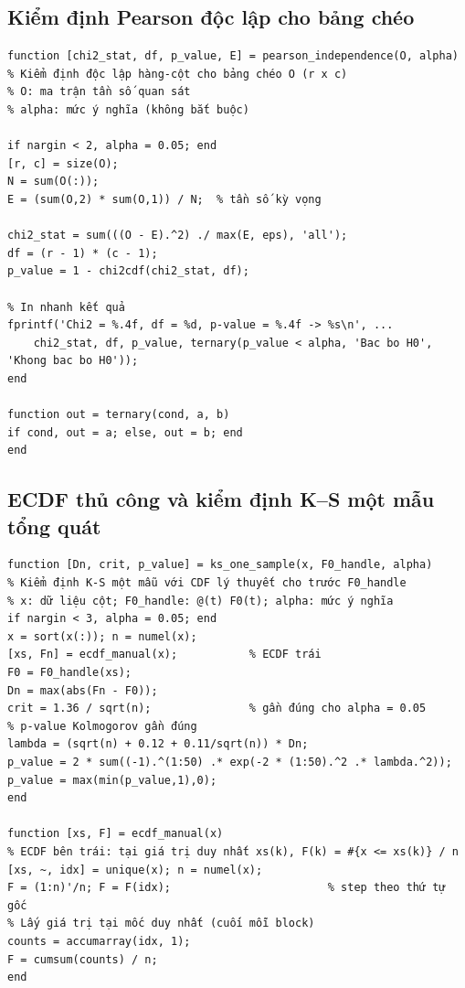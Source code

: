 \subsection{Kiểm định Pearson độc lập cho bảng chéo}
\begin{matlab}
\begin{lstlisting}
function [chi2_stat, df, p_value, E] = pearson_independence(O, alpha)
% Kiểm định độc lập hàng-cột cho bảng chéo O (r x c)
% O: ma trận tần số quan sát
% alpha: mức ý nghĩa (không bắt buộc)

if nargin < 2, alpha = 0.05; end
[r, c] = size(O);
N = sum(O(:));
E = (sum(O,2) * sum(O,1)) / N;  % tần số kỳ vọng

chi2_stat = sum(((O - E).^2) ./ max(E, eps), 'all');
df = (r - 1) * (c - 1);
p_value = 1 - chi2cdf(chi2_stat, df);

% In nhanh kết quả
fprintf('Chi2 = %.4f, df = %d, p-value = %.4f -> %s\n', ...
    chi2_stat, df, p_value, ternary(p_value < alpha, 'Bac bo H0', 'Khong bac bo H0'));
end

function out = ternary(cond, a, b)
if cond, out = a; else, out = b; end
end
\end{lstlisting}
\end{matlab}

\subsection{ECDF thủ công và kiểm định K--S một mẫu tổng quát}
\begin{matlab}
\begin{lstlisting}
function [Dn, crit, p_value] = ks_one_sample(x, F0_handle, alpha)
% Kiểm định K-S một mẫu với CDF lý thuyết cho trước F0_handle
% x: dữ liệu cột; F0_handle: @(t) F0(t); alpha: mức ý nghĩa
if nargin < 3, alpha = 0.05; end
x = sort(x(:)); n = numel(x);
[xs, Fn] = ecdf_manual(x);           % ECDF trái
F0 = F0_handle(xs);
Dn = max(abs(Fn - F0));
crit = 1.36 / sqrt(n);               % gần đúng cho alpha = 0.05
% p-value Kolmogorov gần đúng
lambda = (sqrt(n) + 0.12 + 0.11/sqrt(n)) * Dn;
p_value = 2 * sum((-1).^(1:50) .* exp(-2 * (1:50).^2 .* lambda.^2));
p_value = max(min(p_value,1),0);
end

function [xs, F] = ecdf_manual(x)
% ECDF bên trái: tại giá trị duy nhất xs(k), F(k) = #{x <= xs(k)} / n
[xs, ~, idx] = unique(x); n = numel(x);
F = (1:n)'/n; F = F(idx);                        % step theo thứ tự gốc
% Lấy giá trị tại mốc duy nhất (cuối mỗi block)
counts = accumarray(idx, 1);
F = cumsum(counts) / n;
end
\end{lstlisting}
\end{matlab}

